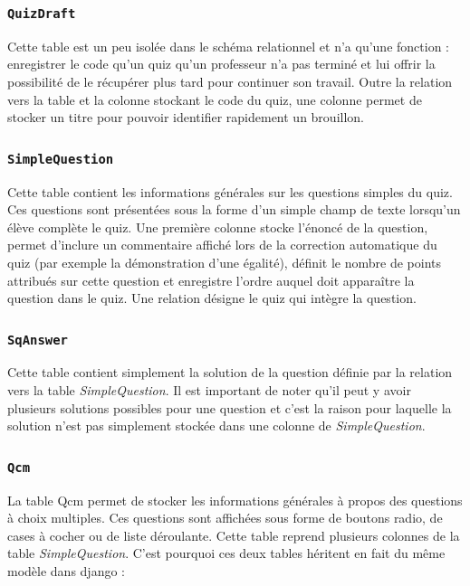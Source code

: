 \documentclass[a4,10pt,french]{sphinxmanual}
\begin{document}
\subsubsection{\texttt{QuizDraft}}
\label{database:quizdraft}
Cette table est un peu isolée dans le schéma relationnel et n'a qu'une fonction : enregistrer le code qu'un quiz qu'un professeur n'a pas terminé et lui offrir la possibilité de le récupérer plus tard pour continuer son travail. Outre la relation vers la table  et la colonne stockant le code du quiz, une colonne permet de stocker un titre pour pouvoir identifier rapidement un brouillon.


\subsubsection{\texttt{SimpleQuestion}}
\label{database:simplequestion}
Cette table contient les informations générales sur les questions simples du quiz. Ces questions sont présentées sous la forme d'un simple champ de texte lorsqu'un élève complète le quiz. Une première colonne  stocke l'énoncé de la question,  permet d'inclure un commentaire affiché lors de la correction automatique du quiz (par exemple la démonstration d'une égalité),  définit le nombre de points attribués sur cette question et  enregistre l'ordre auquel doit apparaître la question dans le quiz. Une relation désigne le quiz qui intègre la question.


\subsubsection{\texttt{SqAnswer}}
\label{database:sqanswer}
Cette table contient simplement la solution de la question définie par la relation vers la table \emph{SimpleQuestion}. Il est important de noter qu'il peut y avoir plusieurs solutions possibles pour une question et c'est la raison pour laquelle la solution n'est pas simplement stockée dans une colonne de \emph{SimpleQuestion}.


\subsubsection{\texttt{Qcm}}
\label{database:qcm}
La table Qcm permet de stocker les informations générales à propos des questions à choix multiples. Ces questions sont affichées sous forme de boutons radio, de cases à cocher ou de liste déroulante.
Cette table reprend plusieurs colonnes de la table \emph{SimpleQuestion}. C'est pourquoi ces deux tables héritent en fait du même modèle dans django :
\end{document}
